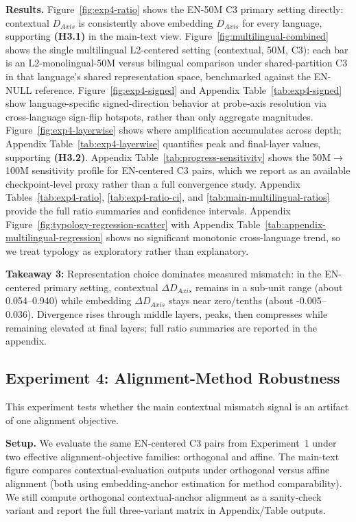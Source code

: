\documentclass[11pt]{article}
\begin{document}
\textbf{Results.} Figure~\ref{fig:exp4-ratio} shows the EN-50M C3 primary setting directly: contextual $D_{Axis}$ is consistently above embedding $D_{Axis}$ for every language, supporting \textbf{(H3.1)} in the main-text view. Figure~\ref{fig:multilingual-combined} shows the single multilingual L2-centered setting (contextual, 50M, C3): each bar is an L2-monolingual-50M versus bilingual comparison under shared-partition C3 in that language's shared representation space, benchmarked against the EN-NULL reference. Figure~\ref{fig:exp4-signed} and Appendix Table~\ref{tab:exp4-signed} show language-specific signed-direction behavior at probe-axis resolution via cross-language sign-flip hotspots, rather than only aggregate magnitudes. Figure~\ref{fig:exp4-layerwise} shows where amplification accumulates across depth; Appendix Table~\ref{tab:exp4-layerwise} quantifies peak and final-layer values, supporting \textbf{(H3.2)}. Appendix Table~\ref{tab:progress-sensitivity} shows the 50M$\rightarrow$100M sensitivity profile for EN-centered C3 pairs, which we report as an available checkpoint-level proxy rather than a full convergence study. Appendix Tables~\ref{tab:exp4-ratio}, \ref{tab:exp4-ratio-ci}, and \ref{tab:main-multilingual-ratios} provide the full ratio summaries and confidence intervals. Appendix Figure~\ref{fig:typology-regression-scatter} with Appendix Table~\ref{tab:appendix-multilingual-regression} shows no significant monotonic cross-language trend, so we treat typology as exploratory rather than explanatory.

\begin{insightbox}
\textbf{Takeaway 3:} Representation choice dominates measured mismatch: in the EN-centered primary setting, contextual $\Delta D_{Axis}$ remains in a sub-unit range (about 0.054--0.940) while embedding $\Delta D_{Axis}$ stays near zero/tenths (about -0.005--0.036). Divergence rises through middle layers, peaks, then compresses while remaining elevated at final layers; full ratio summaries are reported in the appendix.
\end{insightbox}

\subsection{Experiment 4: Alignment-Method Robustness}
\label{sec:exp4}
This experiment tests whether the main contextual mismatch signal is an artifact of one alignment objective.

\textbf{Setup.} We evaluate the same EN-centered C3 pairs from Experiment~1 under two effective alignment-objective families: orthogonal and affine. The main-text figure compares contextual-evaluation outputs under orthogonal versus affine alignment (both using embedding-anchor estimation for method comparability). We still compute orthogonal contextual-anchor alignment as a sanity-check variant and report the full three-variant matrix in Appendix/Table outputs.
\end{document}

